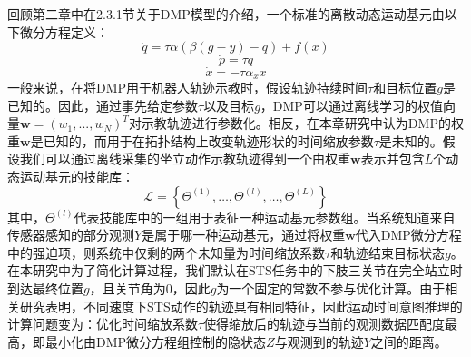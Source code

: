 回顾第二章中在2.3.1节关于DMP模型的介绍，一个标准的离散动态运动基元由以下微分方程定义：
\begin{equation}
    \dot{q}=\tau \alpha\left(\beta(g-y)-q\right)+f(x)
    \label{eq:4-7}
\end{equation}
\begin{equation}
    \dot{p}=\tau q 
    \label{eq:4-8}
\end{equation}
\begin{equation}
    \dot{x}=-\tau \alpha_x x
    \label{eq:4-9}
\end{equation}
一般来说，在将DMP用于机器人轨迹示教时，假设轨迹持续时间$τ$和目标位置$g$是已知的。因此，通过事先给定参数$τ$以及目标$g$，DMP可以通过离线学习的权值向量$\pmb{w}=(w_1,...,w_N)^T$对示教轨迹进行参数化。相反，在本章研究中认为DMP的权重$\pmb{w}$是已知的，而用于在拓扑结构上改变轨迹形状的时间缩放参数$\tau$是未知的。假设我们可以通过离线采集的坐立动作示教轨迹得到一个由权重$\pmb{w}$表示并包含$L$个动态运动基元的技能库：
\begin{equation}
    \mathscr{L}=\left\{\Theta^{(1)}, \ldots, \Theta^{(l)}, \ldots, \Theta^{(L)}\right\}
    \label{eq:4-10}
\end{equation}
其中，$\Theta^{(l)}$代表技能库中的一组用于表征一种运动基元参数组。当系统知道来自传感器感知的部分观测$Y$是属于哪一种运动基元，通过将权重$\pmb{w}$代入DMP微分方程中的强迫项，则系统中仅剩的两个未知量为时间缩放系数$\tau$和轨迹结束目标状态$g$。在本研究中为了简化计算过程，我们默认在STS任务中的下肢三关节在完全站立时到达最终位置$g$，且关节角为0，因此$g$为一个固定的常数不参与优化计算。由于相关研究表明，不同速度下STS动作的轨迹具有相同特征，因此运动时间意图推理的计算问题变为：优化时间缩放系数$\tau$使得缩放后的轨迹与当前的观测数据匹配度最高，即最小化由DMP微分方程组控制的隐状态$Z$与观测到的轨迹$Y$之间的距离。

